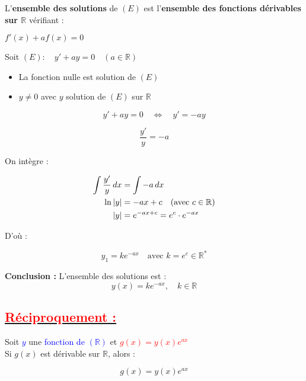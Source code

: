 \documentclass[12pt,a4paper]{article}
\begin{document}
L'\textbf{ensemble des solutions} de \((E)\) est l'\textbf{ensemble des fonctions dérivables sur \(\mathbb{R}\)} vérifiant :
\begin{center}
    \begin{tcolorbox}[colback=white, colframe=red, sharp corners=southwest, boxrule=0.7pt]
        \( f'(x) + af(x) = 0 \)
    \end{tcolorbox}
\end{center}

\vspace{0.3cm}

Soit \((E):\quad y' + ay = 0 \quad (a \in \mathbb{R})\)

\begin{itemize}
    \item La fonction nulle est solution de \((E)\)
    \item \( y \neq 0 \) avec \( y \) solution de \((E)\) sur \(\mathbb{R}\)
\end{itemize}

\[
y' + ay = 0 \quad \Leftrightarrow \quad y' = -ay
\]

\[
\frac{y'}{y} = -a
\]

\vspace{0.3cm}

On intègre :

\begin{align*}
\int \frac{y'}{y} \, dx &= \int -a \, dx \\
\ln |y| &= -ax + c \quad \text{(avec \( c \in \mathbb{R} \))} \\
|y| &= e^{-ax + c} = e^{c} \cdot e^{-ax}
\end{align*}

D’où :

\[
y_1 = ke^{-ax} \quad \text{avec } k = e^c \in \mathbb{R}^{*}
\]

\textbf{Conclusion :} L'ensemble des solutions est :
\[
\boxed{y(x) = ke^{-ax},\quad k \in \mathbb{R}}
\]

\subsection*{\underline{\textcolor{red}{Réciproquement :}}}

Soit \textcolor{blue}{\( y \)} une \textcolor{blue}{fonction de \((\mathbb{R})\)} et \textcolor{red}{\( g(x) = y(x)e^{ax} \)} \\
Si \( g(x) \) est dérivable sur \( \mathbb{R} \), alors :

\[
g(x) = y(x) e^{ax}
\]
\end{document}
